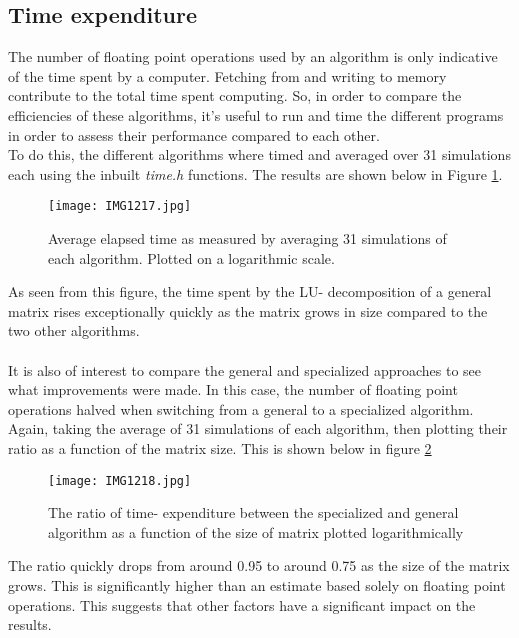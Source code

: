 \documentclass[10pt,a4paper]{article}
\begin{document}
\subsection{Time expenditure}
The number of floating point operations used by an algorithm is only indicative of the time spent by a computer. Fetching from and writing to memory contribute to the total time spent computing. So, in order to compare the efficiencies of these algorithms, it's useful to run and time the different programs in order to assess their performance compared to each other.\\To do this, the different algorithms where timed and averaged over 31 simulations each using the inbuilt \emph{time.h} functions. The results are shown below in Figure \ref{Figure 2}.
\begin{center}
\begin{figure}[H]
\texttt{[image: IMG1217.jpg]} \label{Elapsed time comparison}
	\caption[Comparing elapsed time]{Average elapsed time as measured by averaging 31 simulations of each algorithm. Plotted on a logarithmic scale.}
	\label{Figure 2}
\end{figure}
\end{center}
As seen from this figure, the time spent by the LU- decomposition of a general matrix rises exceptionally quickly as the matrix grows in size compared to the two other algorithms.\\\\It is also of interest to compare the general and specialized approaches to see what improvements were made. In this case, the number of floating point operations halved when switching from a general to a specialized algorithm. Again, taking the average of 31 simulations of each algorithm, then plotting their ratio as a function of the matrix size. This is shown below in figure \ref{Figure 3}
\begin{center}
\begin{figure}[H]
	\texttt{[image: IMG1218.jpg]}
	\caption[Comparing general and specialized (elapsed time)]{The ratio of time- expenditure between the specialized and general algorithm as a function of the size of matrix plotted logarithmically}
	\label{Figure 3}
\end{figure}
\end{center}
The ratio quickly drops from around 0.95 to around 0.75 as the size of the matrix grows. This is significantly higher than an estimate based solely on floating point operations. This suggests that other factors have a significant impact on the results.
\end{document}
